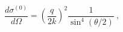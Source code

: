 \begin{equation}
\frac{d\sigma^{(0)}}{d\Omega}=\left(\frac q{2k}\right)^2
\frac1{\sin^4(\theta/2)}\ ,
\end{equation}

